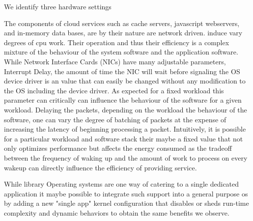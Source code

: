 We identify three hardware settings 

The components of cloud services such as cache servers, javascript webservers, and in-memory data bases, are  by their nature are network driven.  induce vary degrees of cpu work.  Their operation and thus their efficiency is a complex mixture of the behaviour of the system software and the application software.  While Network Interface Cards (NICs) have many adjustable parameters, Interrupt Delay, the amount of time the NIC will wait before signaling the OS device driver is an value that can easily be changed without any modification to the OS including the device driver.   As expected for a fixed workload this parameter can critically can influence the behaviour of the software for a given workload.  Delaying the packets, depending on the workload the behaviour of the software, one can vary the degree of batching of packets at the expense of increasing the latency of beginning processing a packet. Intuitively, it is possible for a particular workload and software stack their maybe a fixed value that not only optimizes performance but affects the energy consumed as the tradeoff between the frequency of waking up and the amount of work to process on every wakeup can directly influence the efficiency of providing service.  

 While library Operating systems are one way of catering to a single dedicated application it maybe possible to integrate such support into a general purpose os by adding a new "single app" kernel configuration that disables or sheds run-time complexity and dynamic behaviors to obtain the same benefits we observe.    